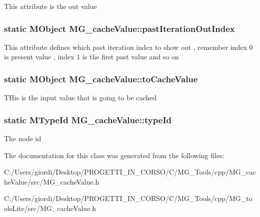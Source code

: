 This attribute is the out value \hypertarget{class_m_g__cache_value_a07da37e093b60361fec58f19b35082cf}{
\subsubsection[{past\-Iteration\-Out\-Index}]{\setlength{\rightskip}{0pt plus 5cm}static M\-Object M\-G\-\_\-cache\-Value\-::past\-Iteration\-Out\-Index\hspace{0.3cm}{\ttfamily [static]}}}\label{class_m_g__cache_value_a07da37e093b60361fec58f19b35082cf}
This attribute defines which past iteration index to show out , remember index 0 is present value , index 1 is the first past value and so on \hypertarget{class_m_g__cache_value_af24eadb6c01a5b74fe866b9ca17f0b01}{
\subsubsection[{to\-Cache\-Value}]{\setlength{\rightskip}{0pt plus 5cm}static M\-Object M\-G\-\_\-cache\-Value\-::to\-Cache\-Value\hspace{0.3cm}{\ttfamily [static]}}}\label{class_m_g__cache_value_af24eadb6c01a5b74fe866b9ca17f0b01}
T\-His is the input value that is going to be cached \hypertarget{class_m_g__cache_value_a4ce6876428ec0f2695f7004b69347c97}{
\subsubsection[{type\-Id}]{\setlength{\rightskip}{0pt plus 5cm}static M\-Type\-Id M\-G\-\_\-cache\-Value\-::type\-Id\hspace{0.3cm}{\ttfamily [static]}}}\label{class_m_g__cache_value_a4ce6876428ec0f2695f7004b69347c97}
The node id 

The documentation for this class was generated from the following files\-:\begin{DoxyCompactItemize}
\item 
C\-:/\-Users/giordi/\-Desktop/\-P\-R\-O\-G\-E\-T\-T\-I\-\_\-\-I\-N\-\_\-\-C\-O\-R\-S\-O/\-C/\-M\-G\-\_\-\-Tools/cpp/\-M\-G\-\_\-cache\-Value/src/M\-G\-\_\-cache\-Value.\-h\item 
C\-:/\-Users/giordi/\-Desktop/\-P\-R\-O\-G\-E\-T\-T\-I\-\_\-\-I\-N\-\_\-\-C\-O\-R\-S\-O/\-C/\-M\-G\-\_\-\-Tools/cpp/\-M\-G\-\_\-tools\-Lite/src/M\-G\-\_\-cache\-Value.\-h\end{DoxyCompactItemize}
